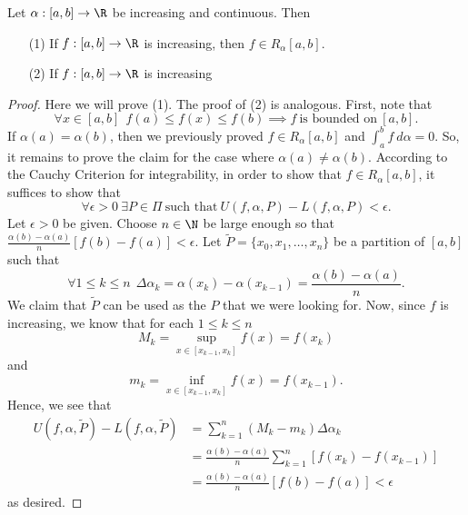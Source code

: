 \begin{theorem}[Rudin 6.9]\label{Rudin 6.9}
    Let \( \alpha: [a,b] \to \R  \) be increasing and continuous. Then 
    \begin{enumerate}
        \item[(1)] If \( f:[a,b] \to \R  \) is increasing, then \( f \in {R}_{\alpha}[a,b] \).
        \item[(2)] If \( f: [a,b] \to \R  \) is increasing
    \end{enumerate}
\end{theorem}
\begin{proof}
Here we will prove (1). The proof of (2) is analogous. First, note that
\[  \forall x \in [a,b] \ \ f(a) \leq f(x) \leq f(b)  \implies f \ \text{is bounded on} \ [a,b].\]
If \( \alpha(a) = \alpha(b) \), then we previously proved \( f \in {R}_{\alpha}[a,b] \) and \( \int_{ a }^{ b }  f  \ d \alpha = 0  \). So, it remains to prove the claim for the case where \( \alpha(a) \neq \alpha(b) \). According to the Cauchy Criterion for integrability, in order to show that \( f \in {R}_{\alpha}[a,b]  \), it suffices to show that
\[  \forall \epsilon > 0 \ \exists P \in \Pi \ \text{such that} \ U(f,\alpha, P) - L(f,\alpha, P) < \epsilon.  \]
Let \( \epsilon > 0  \) be given. Choose \( n \in \N \) be large enough so that \( \frac{ \alpha(b) - \alpha(a)  }{ n  }  [f(b) - f(a)] < \epsilon \). Let \( \tilde{P} = \{  x_{0}, {x}_{1}, \dots, {x}_{n} \}  \) be a partition of \( [a,b] \) such that 
\[  \forall 1 \leq k \leq n \ \ \Delta {\alpha}_{k} = \alpha({x}_{k}) - \alpha({x}_{k-1}) = \frac{ \alpha(b) - \alpha(a) }{  n  }. \]
We claim that \( \tilde{P} \) can be used as the \( P  \) that we were looking for. Now, since \( f  \) is increasing, we know that for each \( 1 \leq  k \leq n  \)
\[  {M}_{k} = \sup_{x \in [{x}_{k-1}, {x}_{k}]} f(x) = f({x}_{k}) \]
and
\[  {m}_{k } = \inf_{x \in [{x}_{k-1}, {x}_{k}]} f(x) = f({x}_{k-1}). \]
Hence, we see that 
\begin{align*}
    U(f,\alpha, \tilde{P}) - L(f,\alpha, \tilde{P})  &= \sum_{ k=1  }^{ n } ({M}_{k } - {m}_{k}) \Delta {\alpha}_{k }  \\
                                                     &= \frac{ \alpha(b) - \alpha(a) }{ n }  \sum_{ k=1  }^{ n } [f({x}_{k}) - f({x}_{k-1})] \\
                                                     &= \frac{ \alpha(b) - \alpha(a) }{  n }  [f(b) - f(a)] < \epsilon
\end{align*}
as desired.
\end{proof}

